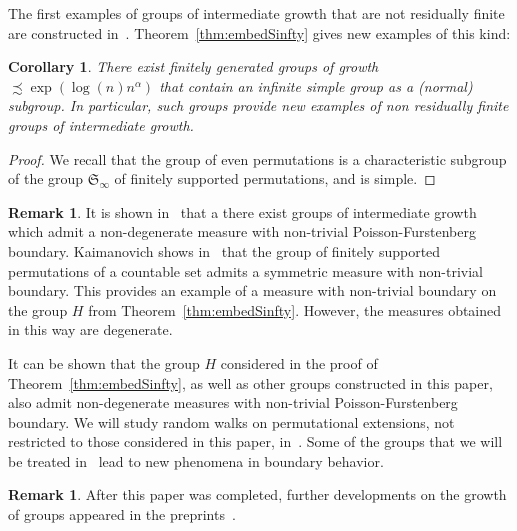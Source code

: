 \documentclass{amsart}
\newtheorem{corollary}[lemma]{Corollary}
\theoremstyle{definition}
\newtheorem{remark}[lemma]{Remark}
\begin{document}
The first examples of groups of intermediate growth that are not
residually finite are constructed
in~\cite{erschler:nonrf}. Theorem~\ref{thm:embedSinfty} gives new
examples of this kind:
\begin{corollary}
  There exist finitely generated groups of growth
  $\precsim\exp(\log(n)n^\alpha)$ that contain an infinite simple
  group as a (normal) subgroup. In particular, such groups provide new
  examples of non residually finite groups of intermediate growth.
\end{corollary}
\begin{proof}
  We recall that the group of even permutations is a characteristic
  subgroup of the group $\mathfrak S_\infty$ of finitely supported
  permutations, and is simple.
\end{proof}

\begin{remark}
  It is shown in~\cite{erschler:boundarysubexp} that a there exist
  groups of intermediate growth which admit a non-degenerate measure
  with non-trivial Poisson-Furstenberg boundary.  Kaimanovich shows
  in~\cite{kaimanovich:ntexit} that the group of finitely supported
  permutations of a countable set admits a symmetric measure with
  non-trivial boundary. This provides an example of a measure with
  non-trivial boundary on the group $H$ from
  Theorem~\ref{thm:embedSinfty}. However, the measures obtained in
  this way are degenerate.

  It can be shown that the group $H$ considered in the proof of
  Theorem~\ref{thm:embedSinfty}, as well as other groups constructed
  in this paper, also admit non-degenerate measures with non-trivial
  Poisson-Furstenberg boundary. We will study random walks on
  permutational extensions, not restricted to those considered in this
  paper, in~\cite{bartholdi-e:rwperm}.  Some of the groups that
  we will be treated in~\cite{bartholdi-e:rwperm} lead to new
  phenomena in boundary behavior.
\end{remark}

\begin{remark}
  After this paper was completed, further developments on the growth
  of groups appeared in the
  preprints~\cites{brieussel:growth,kassabov-pak:growth,bartholdi-erschler:givengrowth}.
\end{remark}

\end{document}

